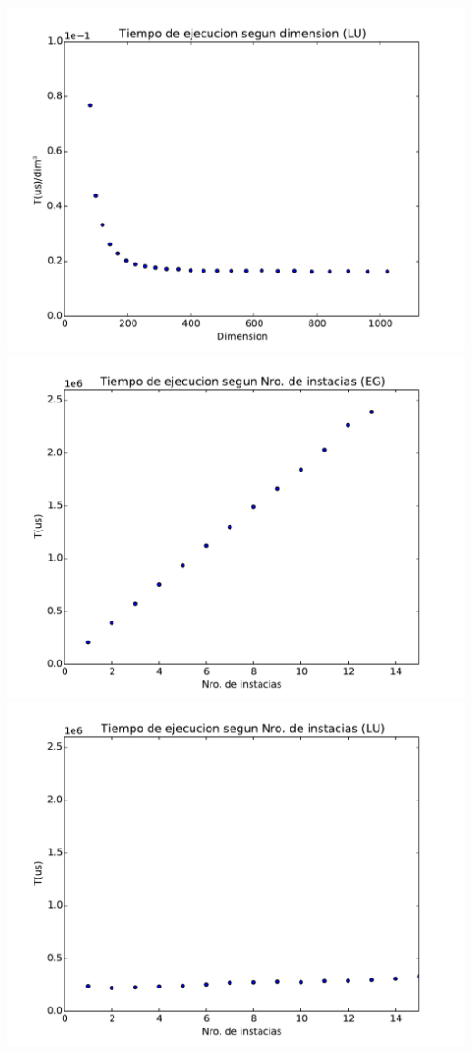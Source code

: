 \includegraphics[scale=0.45]{graficos/dimVariableDiv_LU.pdf}
\newline
\includegraphics[scale=0.45]{graficos/instVariable_EG.pdf}
\includegraphics[scale=0.45]{graficos/instVariable_LU.pdf}

